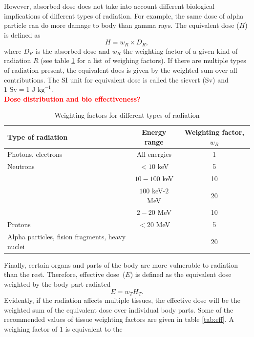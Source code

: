 \documentclass[preprint,aip,cha]{revtex4-1}
\newcommand{\red}[1]{\textcolor{red}{\bf #1}}
\begin{document}
        However, absorbed dose does not take into account different biological implications of different types
        of radiation.
        For example, the same dose of alpha particle can do more damage to body than gamma rays. The equivalent
        dose ($H$) is defined as
        \[H=w_R \times D_R,\]
        where $D_R$ is the absorbed dose and $w_R$ the weighting factor of a given kind of radiation $R$
        (see table \ref{tab:eq} for a list of weighing factors). If there are multiple types of radiation 
        present, the equivalent does is given by the weighted sum over all contributions. The SI unit for
        equivalent dose is called the sievert (Sv) and $1\text{ Sv}=1\text{ J kg}^{-1}$.
        \\\red{Dose distribution and bio effectiveness?}
        \begin{table}
            \label{tab:eq}
            \centering
            \caption{Weighting factors for different types of radiation\cite{icrp74}}
            \begin{ruledtabular}
                \begin{tabular}{l c c}
                Type of radiation & Energy range & Weighting factor, $w_R$\\
                \hline
                Photons, electrons & All energies & 1\\
                Neutrons & $<10$ keV & 5 \\
                         & $10-100$ keV & 10 \\
                         & $100$ keV-$2$ MeV & 20 \\
                         & $2-20$ MeV & 10 \\
                Protons & $<20$ MeV & 5 \\
                Alpha particles, fision fragments, heavy nuclei & & $20$\\
            \end{tabular}
            \end{ruledtabular}
        \end{table}
        Finally, certain organs and parts of the body are more vulnerable to radiation than the rest.
        Therefore, effective dose~($E$) is defined as the equivalent dose weighted by the body part
        radiated
        \[E = w_T H_T.\]
        Evidently, if the radiation affects multiple tissues, the effective dose will be the weighted
        sum of the equivalent dose over individual body parts. Some of the recommended values of tissue
        weighting factors are given in table \ref{tab:eff}. A weighing factor of $1$ is equivalent to the
\end{document}
